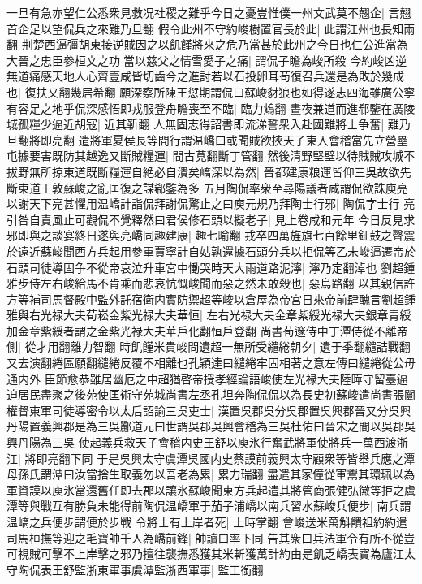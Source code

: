 一旦有急亦望仁公悉衆見救况社稷之難乎今日之憂豈惟僕一州文武莫不翹企|{
	言翹首企足以望侃兵之來難乃旦翻}
假令此州不守約峻樹置官長於此|{
	此謂江州也長知兩翻}
荆楚西逼彊胡東接逆賊因之以飢饉將來之危乃當甚於此州之今日也仁公進當為大晉之忠臣參桓文之功當以慈父之情雪愛子之痛|{
	謂侃子瞻為峻所殺}
今約峻凶逆無道痛感天地人心齊壹咸皆切齒今之進討若以石投卵耳苟復召兵還是為敗於幾成也|{
	復扶又翻幾居希翻}
願深察所陳王愆期謂侃曰蘇峻豺狼也如得遂志四海雖廣公寧有容足之地乎侃深感悟即戎服登舟瞻喪至不臨|{
	臨力鴆翻}
晝夜兼道而進郗鑒在廣陵城孤糧少逼近胡寇|{
	近其靳翻}
人無固志得詔書即流涕誓衆入赴國難將士争奮|{
	難乃旦翻將即亮翻}
遣將軍夏侯長等間行謂温嶠曰或聞賊欲挾天子東入會稽當先立營壘屯據要害既防其越逸又斷賊糧運|{
	間古莧翻斷丁管翻}
然後清野堅壁以待賊賊攻城不拔野無所掠東道既斷糧運自絶必自潰矣嶠深以為然|{
	晉都建康粮運皆仰三吳故欲先斷東道王敦蘇峻之亂匡復之謀郗鍳為多}
五月陶侃率衆至尋陽議者咸謂侃欲誅庾亮以謝天下亮甚懼用温嶠計詣侃拜謝侃驚止之曰庾元規乃拜陶士行邪|{
	陶侃字士行}
亮引咎自責風止可觀侃不覺釋然曰君侯修石頭以擬老子|{
	見上卷咸和元年}
今日反見求邪即與之談宴終日遂與亮嶠同趣建康|{
	趣七喻翻}
戎卒四萬旌旗七百餘里鉦鼓之聲震於遠近蘇峻聞西方兵起用參軍賈寧計自姑孰還據石頭分兵以拒侃等乙未峻逼遷帝於石頭司徒導固争不從帝哀泣升車宮中慟哭時天大雨道路泥濘|{
	濘乃定翻淖也}
劉超鍾雅步侍左右峻給馬不肯乘而悲哀忼慨峻聞而惡之然未敢殺也|{
	惡烏路翻}
以其親信許方等補司馬督殿中監外託宿衛内實防禦超等峻以倉屋為帝宮日來帝前肆醜言劉超鍾雅與右光禄大夫荀崧金紫光禄大夫華恒|{
	左右光禄大夫金章紫綬光禄大夫銀章青綬加金章紫綬者謂之金紫光禄大夫華戶化翻恒戶登翻}
尚書荀邃侍中丁潭侍從不離帝側|{
	從才用翻離力智翻}
時飢饉米貴峻問遺超一無所受繾綣朝夕|{
	遺于季翻繾詰戰翻又去演翻綣區願翻繾綣反覆不相離也孔穎達曰繾綣牢固相著之意左傳曰繾綣從公毋通内外}
臣節愈恭雖居幽厄之中超猶啓帝授孝經論語峻使左光禄大夫陸曄守留臺逼迫居民盡聚之後苑使匡術守苑城尚書左丞孔坦奔陶侃侃以為長史初蘇峻遣尚書張闓權督東軍司徒導密令以太后詔諭三吳吏士|{
	漢置吳郡吳分吳郡置吳興郡晉又分吳興丹陽置義興郡是為三吳酈道元曰世謂吳郡吳興會稽為三吳杜佑曰晉宋之間以吳郡吳興丹陽為三吳}
使起義兵救天子會稽内史王舒以庾氷行奮武將軍使將兵一萬西渡浙江|{
	將即亮翻下同}
于是吳興太守虞潭吳國内史蔡謨前義興太守顧衆等皆舉兵應之潭母孫氏謂潭曰汝當捨生取義勿以吾老為累|{
	累力瑞翻}
盡遣其家僮從軍鬻其環珮以為軍資謨以庾氷當還舊任即去郡以讓氷蘇峻聞東方兵起遣其將管商張健弘徽等拒之虞潭等與戰互有勝負未能得前陶侃温嶠軍于茄子浦嶠以南兵習水蘇峻兵便步|{
	南兵謂温嶠之兵便步謂便於步戰}
令將士有上岸者死|{
	上時掌翻}
會峻送米萬斛饋祖約約遣司馬桓撫等迎之毛寶帥千人為嶠前鋒|{
	帥讀曰率下同}
告其衆曰兵法軍令有所不從豈可視賊可擊不上岸擊之邪乃擅往襲撫悉獲其米斬獲萬計約由是飢乏嶠表寶為廬江太守陶侃表王舒監浙東軍事虞潭監浙西軍事|{
	監工銜翻}
